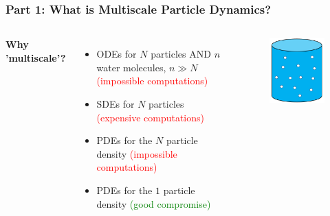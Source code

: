 \documentclass[aspectratio=169,xcolor=dvipsnames]{beamer}
\begin{document}
\begin{frame}
	\frametitle{Part 1: What is Multiscale Particle Dynamics?}
	\begin{columns}
		\textbf{Why 'multiscale'?}
		\vspace{0.4cm}
		\begin{itemize}
			\item ODEs for $N$ particles AND $n$ water molecules, $n \gg N$\\ \textcolor{red}{(impossible computations)}
			\item SDEs for $N$ particles \textcolor{red}{(expensive computations)}
			\item PDEs for the $N$ particle density  \textcolor{red}{(impossible computations)}
			\item PDEs for the $1$ particle density \textcolor{green}{(good compromise)}
		\end{itemize}
	
	\begin{figure}
		\includegraphics[width=4cm]{Particles3.png}
	\end{figure}
	\end{columns}
\end{frame}
\end{document}
